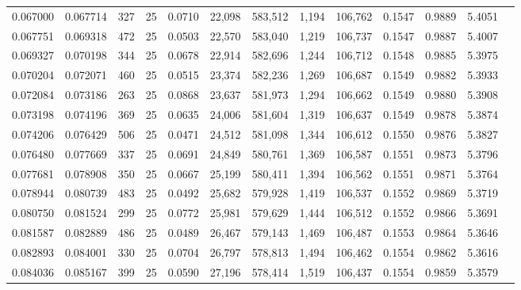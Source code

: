 \begin{tabular}{rrrrrrrrrrrrr}
0.067000 & 0.067714 &   327 &  25 &                                     0.0710 &  22,098 & 583,512 &   1,194 & 106,762 & 0.1547 & 0.9889 & 5.4051 \\
0.067751 & 0.069318 &   472 &  25 &                                     0.0503 &  22,570 & 583,040 &   1,219 & 106,737 & 0.1547 & 0.9887 & 5.4007 \\
0.069327 & 0.070198 &   344 &  25 &                                     0.0678 &  22,914 & 582,696 &   1,244 & 106,712 & 0.1548 & 0.9885 & 5.3975 \\
0.070204 & 0.072071 &   460 &  25 &                                     0.0515 &  23,374 & 582,236 &   1,269 & 106,687 & 0.1549 & 0.9882 & 5.3933 \\
0.072084 & 0.073186 &   263 &  25 &                                     0.0868 &  23,637 & 581,973 &   1,294 & 106,662 & 0.1549 & 0.9880 & 5.3908 \\
0.073198 & 0.074196 &   369 &  25 &                                     0.0635 &  24,006 & 581,604 &   1,319 & 106,637 & 0.1549 & 0.9878 & 5.3874 \\
0.074206 & 0.076429 &   506 &  25 &                                     0.0471 &  24,512 & 581,098 &   1,344 & 106,612 & 0.1550 & 0.9876 & 5.3827 \\
0.076480 & 0.077669 &   337 &  25 &                                     0.0691 &  24,849 & 580,761 &   1,369 & 106,587 & 0.1551 & 0.9873 & 5.3796 \\
0.077681 & 0.078908 &   350 &  25 &                                     0.0667 &  25,199 & 580,411 &   1,394 & 106,562 & 0.1551 & 0.9871 & 5.3764 \\
0.078944 & 0.080739 &   483 &  25 &                                     0.0492 &  25,682 & 579,928 &   1,419 & 106,537 & 0.1552 & 0.9869 & 5.3719 \\
0.080750 & 0.081524 &   299 &  25 &                                     0.0772 &  25,981 & 579,629 &   1,444 & 106,512 & 0.1552 & 0.9866 & 5.3691 \\
0.081587 & 0.082889 &   486 &  25 &                                     0.0489 &  26,467 & 579,143 &   1,469 & 106,487 & 0.1553 & 0.9864 & 5.3646 \\
0.082893 & 0.084001 &   330 &  25 &                                     0.0704 &  26,797 & 578,813 &   1,494 & 106,462 & 0.1554 & 0.9862 & 5.3616 \\
0.084036 & 0.085167 &   399 &  25 &                                     0.0590 &  27,196 & 578,414 &   1,519 & 106,437 & 0.1554 & 0.9859 & 5.3579 \\

\end{tabular}
